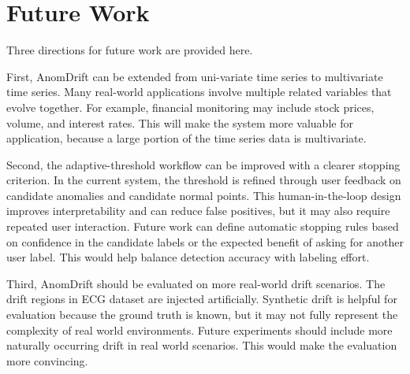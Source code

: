 \section{Future Work}

Three directions for future work are provided here. 

First, AnomDrift can be extended from uni-variate time series to multivariate time series. Many real-world applications involve multiple related variables that evolve together. For example, financial monitoring may include stock prices, volume, and interest rates. This will make the system more valuable for application, because a large portion of the time series data is multivariate.

Second, the adaptive-threshold workflow can be improved with a clearer stopping criterion. In the current system, the threshold is refined through user feedback on candidate anomalies and candidate normal points. This human-in-the-loop design improves interpretability and can reduce false positives, but it may also require repeated user interaction. Future work can define automatic stopping rules based on  confidence in the candidate labels or the expected benefit of asking for another user label. This would help balance detection accuracy with labeling effort.

Third, AnomDrift should be evaluated on more real-world drift scenarios. The drift regions in ECG dataset are injected artificially. Synthetic drift is helpful for evaluation because the ground truth is known, but it may not fully represent the complexity of real world environments. Future experiments should include more naturally occurring drift in real world scenarios. This would make the evaluation more convincing.